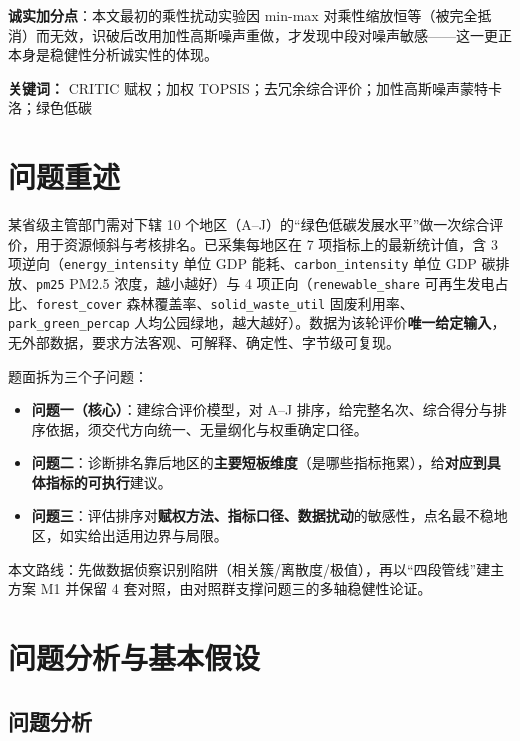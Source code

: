 \documentclass[12pt,a4paper]{ctexart}
\begin{document}
\textbf{诚实加分点}：本文最初的乘性扰动实验因 min-max 对乘性缩放恒等（被完全抵消）而无效，识破后改用加性高斯噪声重做，才发现中段对噪声敏感——这一更正本身是稳健性分析诚实性的体现。

\vspace{1em}
\noindent\textbf{关键词：} CRITIC 赋权；加权 TOPSIS；去冗余综合评价；加性高斯噪声蒙特卡洛；绿色低碳

\newpage
\tableofcontents
\newpage

\section{问题重述}

某省级主管部门需对下辖 10 个地区（A--J）的``绿色低碳发展水平''做一次综合评价，用于资源倾斜与考核排名。已采集每地区在 7 项指标上的最新统计值，含 3 项逆向（\texttt{energy\_intensity} 单位 GDP 能耗、\texttt{carbon\_intensity} 单位 GDP 碳排放、\texttt{pm25} PM2.5 浓度，越小越好）与 4 项正向（\texttt{renewable\_share} 可再生发电占比、\texttt{forest\_cover} 森林覆盖率、\texttt{solid\_waste\_util} 固废利用率、\texttt{park\_green\_percap} 人均公园绿地，越大越好）。数据为该轮评价\textbf{唯一给定输入}，无外部数据，要求方法客观、可解释、确定性、字节级可复现。

题面拆为三个子问题：

\begin{itemize}
\item \textbf{问题一（核心）}：建综合评价模型，对 A--J 排序，给完整名次、综合得分与排序依据，须交代方向统一、无量纲化与权重确定口径。
\item \textbf{问题二}：诊断排名靠后地区的\textbf{主要短板维度}（是哪些指标拖累），给\textbf{对应到具体指标的可执行}建议。
\item \textbf{问题三}：评估排序对\textbf{赋权方法、指标口径、数据扰动}的敏感性，点名最不稳地区，如实给出适用边界与局限。
\end{itemize}

本文路线：先做数据侦察识别陷阱（相关簇/离散度/极值），再以``四段管线''建主方案 M1 并保留 4 套对照，由对照群支撑问题三的多轴稳健性论证。

\section{问题分析与基本假设}

\subsection{问题分析}
\end{document}
